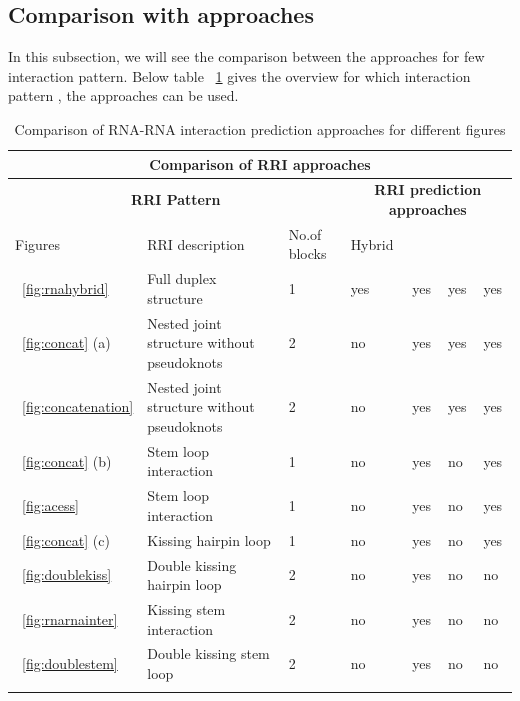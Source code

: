\documentclass[twoside,a4paper]{report}
\begin{document}
	\subsection{Comparison with approaches}
	In this subsection, we will see the comparison between the approaches for few interaction pattern. Below table ~\ref{table:1} gives the overview for which interaction pattern , the approaches can be used. \\
		\begin{table}[H]
				\caption{ Comparison of RNA-RNA interaction prediction approaches for different figures}
				\label{table:1}
		\begin{tabularx}{\textwidth}{ p{2cm}p{4.5cm}p{1.5cm}p{1cm}p{1cm}p{1cm}p{1cm}}
		\toprule
		\multicolumn{7}{c}{\textbf{Comparison of RRI approaches}}\\  
		\midrule
		\multicolumn{3}{c}{\textbf{RRI Pattern}}  & \multicolumn{4}{c}{\textbf{RRI prediction approaches}} \\
		\cmidrule(r){1-3}  \cmidrule(r){4-7}
		Figures & RRI description& No.of blocks& \rotatebox[origin=c]{90} {Hybrid}  &\rotatebox[origin=c]{90}{General}  &\rotatebox[origin=c]{90}{Concatenation}  &\rotatebox[origin=c]{90}{Accessibility} \\
		\hline
		\addlinespace[0.8cm]
		~\ref{fig:rnahybrid}&Full duplex structure&1 &yes &yes &yes &yes\\
		\addlinespace[0.8cm]
		~\ref{fig:concat} (a)& Nested joint structure without pseudoknots &2 & no &yes &yes &yes \\
		\addlinespace[0.8cm]
		~\ref{fig:concatenation}& Nested joint structure without pseudoknots &2 & no &yes &yes &yes \\
		\addlinespace[0.8cm]
		~\ref{fig:concat} (b)& Stem loop interaction &1 & no &yes &no &yes \\
		\addlinespace[0.8cm]
		~\ref{fig:acess} & Stem loop interaction &1 & no &yes &no &yes \\
		\addlinespace[0.8cm]
		~\ref{fig:concat} (c)& Kissing hairpin loop &1 & no &yes &no &yes \\
		\addlinespace[0.8cm]
		~\ref{fig:doublekiss}&Double kissing hairpin loop &2 &no &yes &no &no\\
		\addlinespace[0.8cm]
		~\ref{fig:rnarnainter}& Kissing stem interaction &2 &no &yes &no &no\\
		\addlinespace[0.8cm]
		~\ref{fig:doublestem}& Double kissing stem loop &2 &no &yes &no &no\\
		\addlinespace[0.8cm]
		
	\end{tabularx}
	\end{table}
\end{document}
